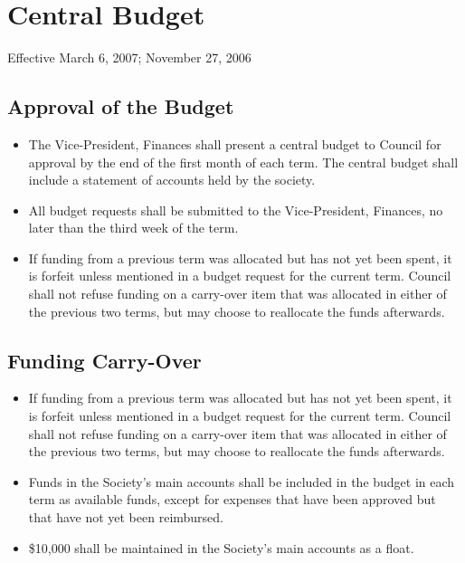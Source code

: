 \section{Central Budget}
Effective March 6, 2007; November 27, 2006

\subsection{Approval of the Budget}
\begin{itemize}
\item The Vice-President, Finances shall present a central budget to Council for approval by the end of the first month of each term. The central budget shall include a statement of accounts held by the society.
\item All budget requests shall be submitted to the Vice-President, Finances, no later than the third week of the term.
\item If funding from a previous term was allocated but has not yet been spent, it is forfeit unless mentioned in a budget request for the current term. Council shall not refuse funding on a carry-over item that was allocated in either of the previous two terms, but may choose to reallocate the funds afterwards.
\end{itemize}


\subsection{Funding Carry-Over}
\begin{itemize}
\item If funding from a previous term was allocated but has not yet been spent, it is forfeit unless mentioned in a budget request for the current term. Council shall not refuse funding on a carry-over item that was allocated in either of the previous two terms, but may choose to reallocate the funds afterwards.
\item Funds in the Society's main accounts shall be included in the budget in each term as available funds, except for expenses that have been approved but that have not yet been reimbursed.
\item \$10,000 shall be maintained in the Society's main accounts as a float.
\end{itemize}

